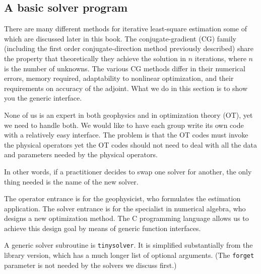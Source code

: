 \subsection{A basic solver program}
There are many different methods for iterative least-square estimation
some of which are discussed later in this book.
The conjugate-gradient (CG) family
(including the first order conjugate-direction method previously described)
share the property that theoretically they achieve the solution
in $n$ iterations, where $n$ is the number of unknowns.
The various CG methods differ
in their numerical errors,
memory required,
adaptability to nonlinear optimization,
and their requirements on accuracy of the adjoint.
What we do in this section is to show you the generic interface.
\par
None of us is an expert in both geophysics and in optimization theory (OT),
yet we need to handle both.
We would like to have each group write its own code with
a relatively easy interface.
The problem is that the OT codes must invoke the physical operators
yet the OT codes should not
need to deal with all the data and parameters needed by the physical operators.
\par
In other words,
if a practitioner decides to
swap one solver for another,
the only thing needed is the name of the new solver.
\par
The operator entrance is for the geophysicist,
who formulates the estimation application.
The solver entrance is for the specialist in numerical algebra,
who designs a new optimization method.
The C programming language allows us
to achieve this design goal by means of generic function interfaces.
\par
A generic solver subroutine is \texttt{tinysolver}. It is simplified substantially from the library version,
which has a much longer list of optional arguments. (The \texttt{forget} parameter
is not needed by the solvers we discuss first.)


